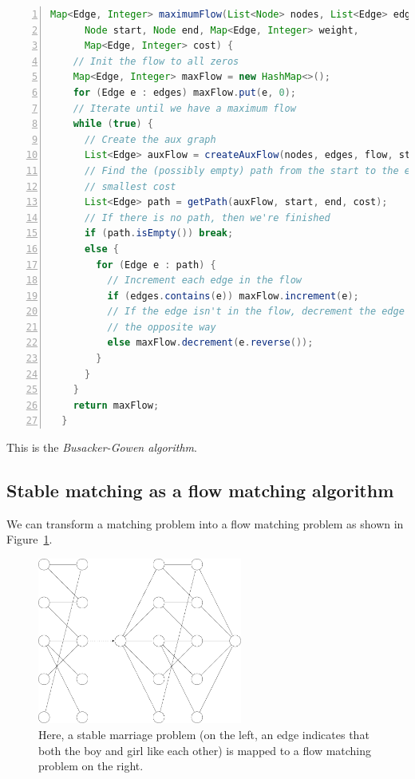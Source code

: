 \begin{lstlisting}[numbers=left,language=Java]
  Map<Edge, Integer> maximumFlow(List<Node> nodes, List<Edge> edges,
      Node start, Node end, Map<Edge, Integer> weight,
      Map<Edge, Integer> cost) {
    // Init the flow to all zeros
    Map<Edge, Integer> maxFlow = new HashMap<>();
    for (Edge e : edges) maxFlow.put(e, 0);
    // Iterate until we have a maximum flow
    while (true) {
      // Create the aux graph
      List<Edge> auxFlow = createAuxFlow(nodes, edges, flow, start, end);
      // Find the (possibly empty) path from the start to the end that has the
      // smallest cost
      List<Edge> path = getPath(auxFlow, start, end, cost);
      // If there is no path, then we're finished
      if (path.isEmpty()) break;
      else {
        for (Edge e : path) {
          // Increment each edge in the flow
          if (edges.contains(e)) maxFlow.increment(e);
          // If the edge isn't in the flow, decrement the edge going
          // the opposite way
          else maxFlow.decrement(e.reverse());
        }
      }
    }
    return maxFlow;
  }
\end{lstlisting}

This is the \textit{Busacker-Gowen algorithm}.

\subsection{Stable matching as a flow matching algorithm}

We can transform a matching problem into a flow matching problem as shown in
Figure~\ref{fig:matching-flow}.

\begin{figure}[H]
  \centering
  \includegraphics[width=0.6\textwidth]{diagrams/matching-flow}
  \caption{Here, a stable marriage problem (on the left, an edge indicates that
    both the boy and girl like each other) is mapped to a flow matching problem
    on the right.}
  \label{fig:matching-flow}
\end{figure}

